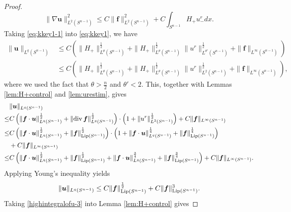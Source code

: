 \documentclass[12pt]{amsart}
\renewcommand{\div}{{\rm div \thinspace }}
\newcommand{\Bu}{{\boldsymbol{u}}}
\newcommand{\Bf}{{\boldsymbol{f}}}
\begin{document}
{\begin{proof}
\begin{equation}
			\|\nabla \Bu\|_{L^2(S^{n-1})}^2 \leq C \|\Bf\|_{L^2(S^{n-1})}^2 + C \int_{S^{n-1}} H_{+} u^r_{-}dx. 
		\end{equation}
		Taking \eqref{eq:kkey1-1} into \eqref{eq:kkey1}, we have 
		\begin{equation}
			\begin{aligned}
				\|\Bu\|_{L^q(S^{n-1})}  &\leq C \left( 
				\|H_{+}\|_{L^\theta(S^{n-1})}^{\frac12} + \|H_{+}\|_{L^\theta(S^{n-1})}^{\frac12} \|u^r\|_{L^{\theta'}(S^{n-1})}^{\frac12} + \|\Bf\|_{L^\infty(S^{n-1})} \right)\\
				& \leq C \left( 
				\|H_{+}\|_{L^\theta(S^{n-1})}^{\frac12} + \|H_{+}\|_{L^\theta(S^{n-1})}^{\frac12} \|u^r\|_{L^{2}(S^{n-1})}^{\frac12} + \|\Bf\|_{L^\infty(S^{n-1})} \right),
			\end{aligned}
		\end{equation}
		where we used the fact that  $\theta > \frac{n}{2}$ and $\theta'< 2$.  This, together with Lemmas \ref{lem:H+control} and \ref{lem:urestim}, gives
		\begin{equation*}
			\begin{aligned}
				&  \|\Bu\|_{L^q(S^{n-1})} \\
				\leq & C\left( \|\Bf\cdot \Bu\|_{L^q(S^{n-1})}^\frac12 + \|\div \Bf\|_{L^q(S^{n-1})}^\frac12\right)\cdot \left( 1+ \|u^r\|_{L^2(S^{n-1})}^{\frac12}\right) + C \|\Bf\|_{L^\infty(S^{n-1})}  \\ 
				\leq  & C \left(\|\Bf\cdot \Bu\|_{L^q(S^{n-1})}^{\frac12} +  \| \Bf\|_{\textnormal{Lip}(S^{n-1})}^\frac12 \right)\cdot \left(1+  \|\Bf\cdot \Bu\|_{L^q(S^{n-1})}^{\frac14} +  \|\Bf\|_{\textnormal{Lip}(S^{n-1})}^\frac14\right)\\
				& + C \|\Bf\|_{L^\infty(S^{n-1})}\\
				\leq & C \left(\|\Bf\cdot \Bu\|_{L^q(S^{n-1})}^{\frac12}+ \|\Bf\|_{\textnormal{Lip}(S^{n-1})}^{\frac12} +\|\Bf\cdot \Bu\|_{L^q(S^{n-1})}^{\frac34}+ \|\Bf\|_{\textnormal{Lip}(S^{n-1})}^{\frac34} \right)+ C \|\Bf\|_{L^\infty(S^{n-1})}.
			\end{aligned}
		\end{equation*}
		Applying Young's inequality yields 
		\begin{equation}\label{highintegralofu-3}
			\begin{aligned}       
				\|\Bu\|_{L^q(S^{n-1})} \leq 
				C \|\Bf\|_{\textnormal{Lip}(S^{n-1})}^{\frac12}+ C \|\Bf\|_{\textnormal{Lip}(S^{n-1})}^3. 
			\end{aligned}
		\end{equation}
		Taking \eqref{highintegralofu-3} into Lemma \ref{lem:H+control} gives

\end{proof}}
\end{document}
